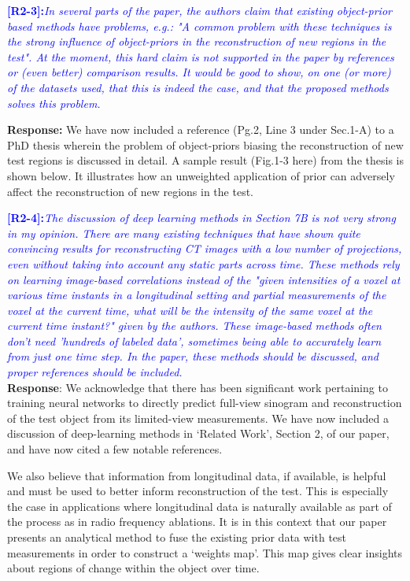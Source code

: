 \documentclass{article}
\begin{document}
\textcolor{blue}{\textbf{[R2-3]:}\textit{In several parts of the
    paper, the authors claim that existing object-prior based methods
    have problems, e.g.: "A common problem with these techniques is
    the strong influence of object-priors in the reconstruction of new
    regions in the test". At the moment, this hard claim is not
    supported in the paper by references or (even better) comparison
    results. It would be good to show, on one (or more) of the
    datasets used, that this is indeed the case, and that the proposed
    methods solves this problem.}}

\textbf{Response:} We have now included a reference (Pg.2, Line 3
under Sec.1-A) to a PhD thesis wherein the problem of object-priors
biasing the reconstruction of new test regions is discussed in detail.
A sample result (Fig.1-3 here) from the thesis is shown below. It
illustrates how an unweighted application of prior can adversely
affect the reconstruction of new regions in the test.


\textcolor{blue}{\textbf{[R2-4]:}\textit{The discussion of deep learning methods in Section 7B is not very strong in my opinion. There are many existing techniques that have shown quite convincing results for reconstructing CT images with a low number of projections, even without taking into account any static parts across time. These methods rely on learning image-based correlations instead of the "given intensities of a voxel at various time instants in a longitudinal setting and partial measurements of the voxel at the current time, what will be the intensity of the same voxel at the current time instant?" given by the authors. These image-based methods often don't need 'hundreds of labeled data', sometimes being able to accurately learn from just one time step. In the paper, these methods should be discussed, and proper references should be included.}}\\

\textbf{Response}: We acknowledge that there has been significant work pertaining to training neural networks to directly predict full-view sinogram and reconstruction of the test object from its limited-view measurements. We have now included a discussion of deep-learning methods in `Related Work', Section 2, of our paper, and have now cited a few notable references.

We also believe that information from longitudinal data, if available, is helpful and must be used to better inform reconstruction of the test. This is especially the case in applications where longitudinal data is naturally available as part of the process as in radio frequency ablations. It is in this context that our paper presents an analytical method to fuse the existing prior data with test measurements in order to construct a `weights map'. This map gives clear insights about regions of change within the object over time.\\
\end{document}
